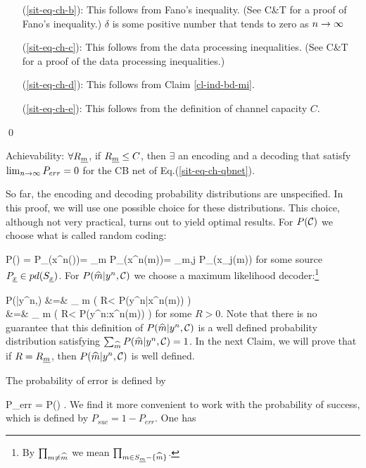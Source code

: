 \begin{itemize}
\item[(\ref{sit-eq-ch-b}):]
This follows from Fano's inequality.
(See C\&T for a proof
of Fano's inequality.)
$\delta$ is some positive number
that tends to zero as $n\rightarrow \infty$

\item[(\ref{sit-eq-ch-c}):] This follows from the data processing
inequalities. (See C\&T for a
proof of the data processing inequalities.)

\item[(\ref{sit-eq-ch-d}):] This
follows from Claim \ref{cl-ind-bd-mi}.


\item[(\ref{sit-eq-ch-e}):] This follows from the definition of
channel capacity $C$.
\end{itemize}
\mbox{\;}
\qed

\begin{claim}
Achievability:
$\forall R_{\underline{m}}$,
if $R_{\underline{m}}\leq C$, then
$\exists$
an encoding and a decoding
that satisfy $\lim_{n\rightarrow\infty}P_{err}=0$
for the CB net of
Eq.(\ref{sit-eq-ch-qbnet}).
\end{claim}
\proof
So far, the
encoding and decoding probability
distributions are unspecified.
In this proof, we will use one
possible choice
for these distributions. This choice,
although not very practical,
turns out to yield optimal results.
For $P({\cal C})$ we choose what is
called random coding:

\beq
P(\calc) = P_\rvx(x^n(\cdot))=
\prod_{m}
P_\rvx(x^n(m))=
\prod_{m,j}
P_\rvx(x_j(m))
\;
\eeq
for some source $P_{\underline{x}}
\in pd(S_{\underline{x}})$.
For
$P({\widehat{m}}|y^n,{\cal C})$
we choose a maximum likelihood
decoder:\footnote{By
$\prod_{ m\neq {\widehat{m}}}$
we mean $\prod_{ m\in S_{\underline{m}}-\{{\widehat{m}}\}}$.
}

\beqa
P(|y^n,\calc)
&=&
\prod_{ m\neq {}}
\theta\left(
R< \ln
{}
{P(y^n|x^n(m))}
\right)
\\
&=&
\prod_{ m\neq {}}
\theta\left(
R< \ln
{}
{P(y^n:x^n(m))}
\right)\;
\eeqa
for some $R>0$.
Note that there is no
guarantee that
this definition of $P({\widehat{m}}|y^n,{\cal C})$
is a well defined probability distribution
satisfying
$\sum_{{\widehat{m}}}P({\widehat{m}}|y^n,{\cal C})=1$.
In the next Claim, we
will prove
that if $R=R_{\underline{m}}$,
then $P({\widehat{m}}|y^n,{\cal C})$
is well defined.

The probability
of error is defined by

\beq
P_{err} =
P(\what{\rvm}\neq \rvm)
\;.
\eeq
We find it more convenient to work
with the probability of success,
which is defined by $P_{suc} =1-P_{err}$.
One has

